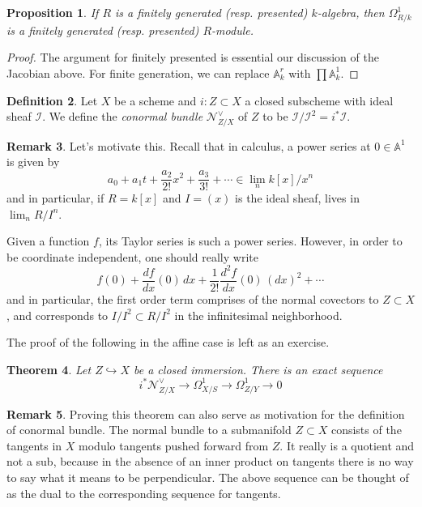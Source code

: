 \documentclass[10pt]{article}
\newtheorem{thm}{Theorem}[section]
\newtheorem{prop}[thm]{Proposition}
\theoremstyle{definition}
\newtheorem{defn}[thm]{Definition}
\newtheorem{rmk}[thm]{Remark}
\begin{document}
\begin{prop}
If $R$ is a finitely generated (resp. presented) $k$-algebra, then $\Omega^1_{R/k}$ is a finitely generated (resp. presented) $R$-module.
\end{prop}
\begin{proof}
The argument for finitely presented is essential our discussion of the Jacobian above.  For finite generation, we can replace $\mathbb{A}^r_k$ with $\prod \mathbb{A}^1_k$.
\end{proof}



\begin{defn}
Let $X$ be a scheme and $i: Z \subset X$ a closed subscheme with ideal sheaf $\mathcal{I}$.  We define the \emph{conormal bundle} $\mathcal{N}^\vee_{Z/X}$ of $Z$ to be $\mathcal{I}/\mathcal{I}^2 = i^* \mathcal{I}$.
\end{defn}

\begin{rmk}
Let's motivate this.  Recall that in calculus, a power series at $0 \in \mathbb{A}^1$ is given by
$$a_0 + a_1 t + \frac{a_2}{2!} x^2 + \frac{a_3}{3!} + \cdots \in \lim_n k[x]/x^n$$
and in particular, if $R = k[x]$ and $I = (x)$ is the ideal sheaf, lives in $\lim_n R/I^n$.  

Given a function $f$, its Taylor series is such a power series.  However, in order to be coordinate independent, one should really write
$$f(0) + \frac{df}{dx}(0) \, dx + \frac{1}{2!}\frac{d^2f}{dx}(0) \, (dx)^2 + \cdots$$
and in particular, the first order term comprises of the normal covectors to $Z \subset X$, and corresponds to $I/I^2 \subset R/I^2$ in the infinitesimal neighborhood.
\end{rmk}

The proof of the following in the affine case is left as an exercise.
\begin{thm}
Let $Z \hookrightarrow X$ be a closed immersion.  There is an exact sequence
$$i^* \mathcal{N}^\vee_{Z/X} \rightarrow \Omega^1_{X/S} \rightarrow \Omega^1_{Z/Y} \rightarrow 0$$
\end{thm}

\begin{rmk}
Proving this theorem can also serve as motivation for the definition of conormal bundle.  The normal bundle to a submanifold $Z \subset X$ consists of the tangents in $X$ modulo tangents pushed forward from $Z$.  It really is a quotient and not a sub, because in the absence of an inner product on tangents there is no way to say what it means to be perpendicular.  The above sequence can be thought of as the dual to the corresponding sequence for tangents.
\end{rmk}
\end{document}

